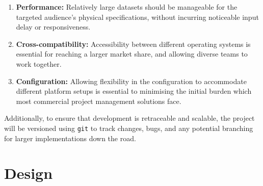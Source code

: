 \documentclass{report}
\begin{document}
	\begin{enumerate}
		\item \textbf{Performance:} Relatively large datasets should be manageable for the targeted audience's physical
				  specifications, without incurring noticeable input delay or responsiveness.
		\item \textbf{Cross-compatibility:} Accessibility between different operating systems is essential for reaching a
				  larger market share, and allowing diverse teams to work together.
		\item \textbf{Configuration:} Allowing flexibility in the configuration to accommodate different platform setups
				  is essential to minimising the initial burden which most commercial project management solutions face.
	\end{enumerate}
	
	Additionally, to ensure that development is retraceable and scalable, the project will be versioned using 
	\verb|git| to track changes, bugs, and any potential branching for larger implementations down the road.
	
	\newpage
	\section{Design}
	
\end{document}
